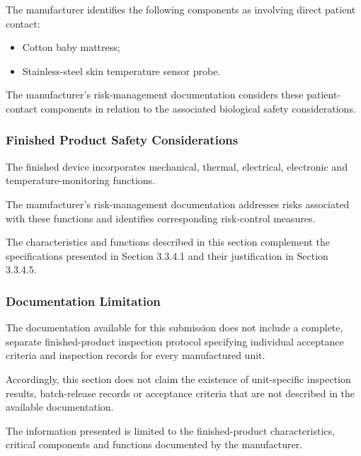 The manufacturer identifies the following components as
involving direct patient contact:

\begin{itemize}
    \item Cotton baby mattress;
    \item Stainless-steel skin temperature sensor probe.
\end{itemize}

The manufacturer's risk-management documentation considers
these patient-contact components in relation to the associated
biological safety considerations.


\subsubsection{Finished Product Safety Considerations}

The finished device incorporates mechanical, thermal, electrical,
electronic and temperature-monitoring functions.

The manufacturer's risk-management documentation addresses
risks associated with these functions and identifies corresponding
risk-control measures.

The characteristics and functions described in this section
complement the specifications presented in Section 3.3.4.1
and their justification in Section 3.3.4.5.


\subsubsection{Documentation Limitation}

The documentation available for this submission does not include
a complete, separate finished-product inspection protocol
specifying individual acceptance criteria and inspection records
for every manufactured unit.

Accordingly, this section does not claim the existence of
unit-specific inspection results, batch-release records or
acceptance criteria that are not described in the available
documentation.

The information presented is limited to the finished-product
characteristics, critical components and functions documented
by the manufacturer.

